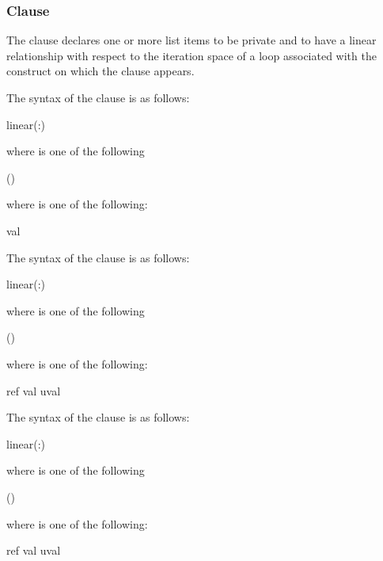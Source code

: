 \subsubsection{ Clause}
\label{subsubsec:linear clause}
\summary
The  clause declares one or more list items to be private and to have 
a linear relationship with respect to the iteration space of a loop associated 
with the construct on which the clause appears.

\syntax


\begin{cspecific}
The syntax of the  clause is as follows:
\begin{ompSyntax}
linear(\plc{linear-list[ }:\plc{ linear-step]})
\end{ompSyntax}
where  is one of the following
 
\begin{indentedcodelist}
()
\end{indentedcodelist}
where   is one of the following:
 
\begin{indentedcodelist}
val
\end{indentedcodelist}
\end{cspecific}

\begin{cppspecific}
The syntax of the  clause is as follows:
\begin{ompSyntax}
linear(\plc{linear-list[ }:\plc{ linear-step]})
\end{ompSyntax}
where  is one of the following
 
\begin{indentedcodelist}
()
\end{indentedcodelist}
where   is one of the following:
 
\begin{indentedcodelist}
ref
val
uval
\end{indentedcodelist}
\end{cppspecific}

\begin{fortranspecific}
The syntax of the  clause is as follows:
\begin{ompSyntax}
linear(\plc{linear-list[ }:\plc{ linear-step]})
\end{ompSyntax}
where  is one of the following
 
\begin{indentedcodelist}
()
\end{indentedcodelist}
where   is one of the following:
 
\begin{indentedcodelist}
ref
val
uval
\end{indentedcodelist}
\end{fortranspecific}

